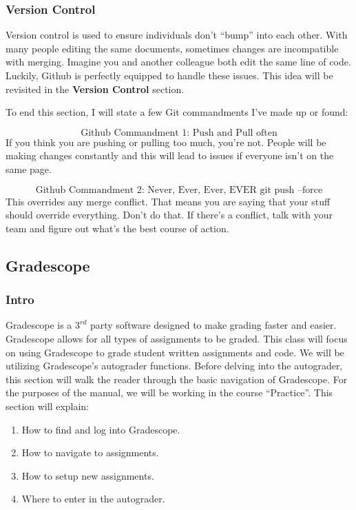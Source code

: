 \documentclass[
]{article}
\begin{document}
\hypertarget{version-control}{%
\subsubsection{Version Control}\label{version-control}}

Version control is used to ensure individuals don't ``bump'' into each
other. With many people editing the same documents, sometimes changes
are incompatible with merging. Imagine you and another colleague both
edit the same line of code. Luckily, Github is perfectly equipped to
handle these issues. This idea will be revisited in the \textbf{Version
Control} section.

To end this section, I will state a few Git commandments I've made up or
found:

\[\text{Github Commandment 1: Push and Pull often}\] If you think you
are pushing or pulling too much, you're not. People will be making
changes constantly and this will lead to issues if everyone isn't on the
same page.

\[\text{Github Commandment 2: Never, Ever, Ever, EVER git push --force}\]
This overrides any merge conflict. That means you are saying that your
stuff should override everything. Don't do that. If there's a conflict,
talk with your team and figure out what's the best course of action.

\hypertarget{gradescope}{%
\subsection{Gradescope}\label{gradescope}}

\hypertarget{intro}{%
\subsubsection{Intro}\label{intro}}

Gradescope is a \(3^{rd}\) party software designed to make grading
faster and easier. Gradescope allows for all types of assignments to be
graded. This class will focus on using Gradescope to grade student
written assignments and code. We will be utilizing Gradescope's
autograder functions. Before delving into the autograder, this section
will walk the reader through the basic navigation of Gradescope. For the
purposes of the manual, we will be working in the course ``Practice''.
This section will explain:

\begin{enumerate}
\def\labelenumi{(\arabic{enumi})}
\item
  How to find and log into Gradescope.
\item
  How to navigate to assignments.
\item
  How to setup new assignments.
\item
  Where to enter in the autograder.
\end{enumerate}
\end{document}
